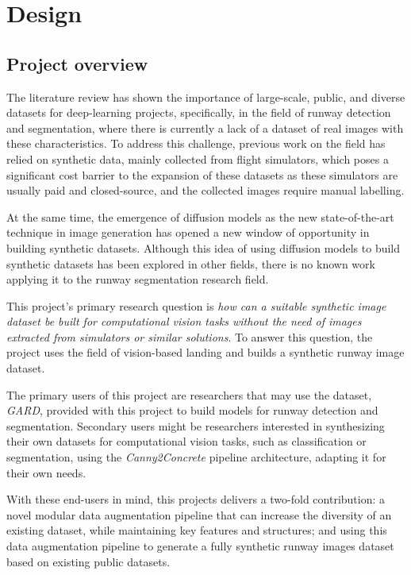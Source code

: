 
\chapter{Design}

\section{Project overview}

The literature review has shown the importance of large-scale, public, and diverse datasets for deep-learning projects, specifically, in the field of runway detection and segmentation, where there is currently a lack of a dataset of real images with these characteristics. To address this challenge, previous work on the field has relied on synthetic data, mainly collected from flight simulators, which poses a significant cost barrier to the expansion of these datasets as these simulators are usually paid and closed-source, and the collected images require manual labelling.

At the same time, the emergence of diffusion models as the new state-of-the-art technique in image generation has opened a new window of opportunity in building synthetic datasets. Although this idea of using diffusion models to build synthetic datasets has been explored in other fields, there is no known work applying it to the runway segmentation research field.

This project's primary research question is \emph{how can a suitable synthetic
image dataset be built for computational vision tasks without the need of images
extracted from simulators or similar solutions}. To answer this question, the project uses the field of vision-based landing and builds a synthetic runway image dataset.

The primary users of this project are researchers that may use the dataset,
\emph{GARD}, provided with this project to
build models for runway detection and segmentation. Secondary users might be
researchers interested in synthesizing their own datasets for
computational vision tasks, such as classification or segmentation, using the
\emph{Canny2Concrete} pipeline architecture, adapting it for their own needs.

With these end-users in mind, this projects delivers a two-fold contribution: a novel modular data augmentation pipeline that can increase the diversity of an existing dataset, while maintaining key features and structures; and using this data augmentation pipeline to generate a fully synthetic runway images dataset based on existing public datasets.


